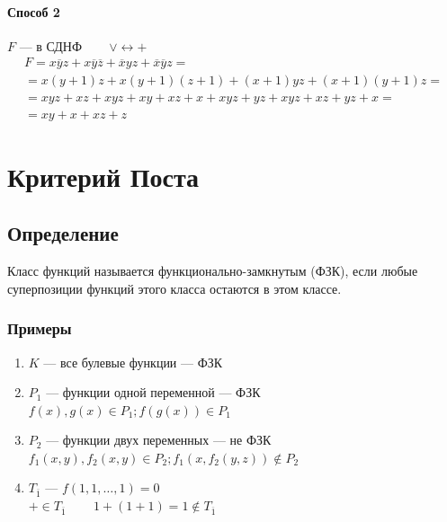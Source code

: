 \documentclass{article}
\begin{document}
\paragraph{Способ 2}
$F$ --- в СДНФ ~~~ $\vee \leftrightarrow +$
\begin{gather*}
    F = x \overline{y} z + x \overline{y} \overline{z} + \overline{x} y z + \overline{x} \overline{y} z = \\
    = x(y + 1)z + x(y + 1)(z + 1) + (x + 1)yz + (x + 1)(y + 1)z = \\
    = xyz + xz + xyz + xy + xz + x + xyz + yz + xyz + xz + yz + x = \\
    = xy + x + xz + z
\end{gather*}



\section{Критерий Поста}

\subsection{Определение}
Класс функций называется функционально-замкнутым (ФЗК), если любые суперпозиции функций этого класса остаются в этом классе.

\subsubsection{Примеры}
\begin{enumerate}
    \item $K$ --- все булевые функции --- ФЗК
    \item $P_1$ --- функции одной переменной --- ФЗК \\
    $f(x), g(x) \in P_1; f(g(x)) \in P_1$
    \item $P_2$ --- функции двух переменных --- не ФЗК \\
    $f_1(x, y), f_2(x, y) \in P_2; f_1(x, f_2(y, z)) \notin P_2$
    \item $T_{\overline{1}}$ --- $f(1, 1, \dots, 1) = 0$ \\
    $+ \in T_{\overline{1}}$ ~~~ $1 + (1 + 1) = 1 \notin T_{\overline{1}}$
\end{enumerate}
\end{document}

